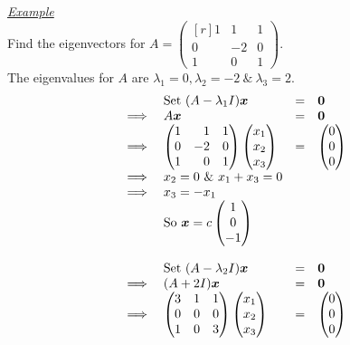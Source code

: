 \documentclass[11pt,a4paper]{article}
\begin{document}
\underline{\textit{Example}}\\
Find the eigenvectors for $A = \begin{pmatrix*}[r] 1 & 1 & 1 \\ 0 & -2 & 0 \\ 1 & 0 & 1 \end{pmatrix*}$.\\
The eigenvalues for $A$ are $\lambda_1 = 0, \lambda_2 = -2\ \&\ \lambda_3 = 2$.\\
\[\begin{array}{clcl}
&\mathrm{Set\ }(A - \lambda_1 I)\vect{x} &=& \vect{0}\\
\implies& A\vect{x} &=& \vect{0}\\
\implies& \begin{pmatrix*}[r] 1 & 1 & 1 \\ 0 & -2 & 0 \\ 1 & 0 & 1\end{pmatrix*}\begin{pmatrix} x_1 \\ x_2 \\ x_3 \end{pmatrix} &=& \begin{pmatrix} 0 \\ 0 \\ 0 \end{pmatrix}\\
\implies& x_2 = 0\ \&\ x_1 + x_3 = 0\\
\implies& x_3 = -x_1\\
&\mathrm{So\ }\vect{x} = c\begin{pmatrix} 1 \\ 0 \\ -1 \end{pmatrix}\\
\\&\mathrm{Set\ }(A - \lambda_2 I)\vect{x} &=& \vect{0}\\
\implies& (A + 2I)\vect{x} &=& \vect{0}\\
\implies& \begin{pmatrix*}[r] 3 & 1 & 1 \\ 0 & 0 & 0 \\ 1 & 0 & 3\end{pmatrix*}\begin{pmatrix} x_1 \\ x_2 \\ x_3 \end{pmatrix} &=& \begin{pmatrix} 0 \\ 0 \\ 0 \end{pmatrix}\\

\end{array}\]
\end{document}
